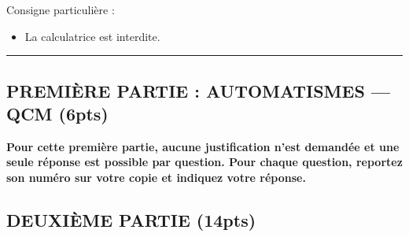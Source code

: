 

\SetDate[07/10/2025]
\reversemarginpar

\setlength{\marginparsep}{.5cm}

\renewcommand{\ExerciseHeader}{
	\textbf{Exercice \theExercise.}
	\ifnum\ExerciseDifficulty=0
	\else
		(\theExerciseDifficulty)
	\fi
}

\newcommand{\exeI}{1}
\newcommand{\exeII}{2}
\newcommand{\exeIII}{3}
\newcommand{\exeIV}{4}
\newcommand{\exeV}{5}
\newcommand{\exeVI}{6}
\newcommand{\exeVII}{7}
\newcommand{\exeVIII}{8}
\newcommand{\exeIX}{9}
\newcommand{\exeX}{10}
\newcommand{\exeXI}{11}


\pagestyle{fancy}
\fancyhead[R]{\today}

\null\vspace{-30pt}
Consigne particulière : 
\begin{itemize}[label=$\bullet$]
	\item 
	La calculatrice est {interdite}.
\end{itemize}

\hrule

\begin{center}
\subsection*{PREMIÈRE PARTIE : AUTOMATISMES — QCM (6pts)}
\end{center}

\textbf{
	Pour cette première partie, aucune justification n'est demandée et une seule réponse est possible par question.
	Pour chaque question, reportez son numéro sur votre copie et indiquez votre réponse.
}

\vspace{30pt}



\newpage

\begin{center}
\subsection*{DEUXIÈME PARTIE (14pts)}
\end{center}





\newpage
{}
\shipoutAnswer


